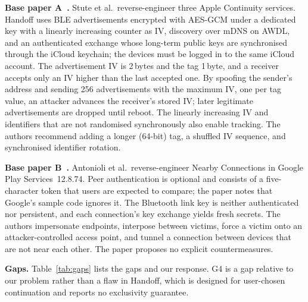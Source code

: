 \documentclass[conference]{IEEEtran}
\begin{document}
\textbf{Base paper A~\cite{stute2021}.} Stute et al.\ reverse-engineer three Apple Continuity services. Handoff uses BLE advertisements encrypted with AES-GCM under a dedicated key with a linearly increasing counter as IV, discovery over mDNS on AWDL, and an authenticated exchange whose long-term public keys are synchronised through the iCloud keychain; the devices must be logged in to the same iCloud account. The advertisement IV is 2\,bytes and the tag 1\,byte, and a receiver accepts only an IV higher than the last accepted one. By spoofing the sender's address and sending 256 advertisements with the maximum IV, one per tag value, an attacker advances the receiver's stored IV; later legitimate advertisements are dropped until reboot. The linearly increasing IV and identifiers that are not randomised synchronously also enable tracking. The authors recommend adding a longer (64-bit) tag, a shuffled IV sequence, and synchronised identifier rotation.

\textbf{Base paper B~\cite{antonioli2019}.} Antonioli et al.\ reverse-engineer Nearby Connections in Google Play Services~12.8.74. Peer authentication is optional and consists of a five-character token that users are expected to compare; the paper notes that Google's sample code ignores it. The Bluetooth link key is neither authenticated nor persistent, and each connection's key exchange yields fresh secrets. The authors impersonate endpoints, interpose between victims, force a victim onto an attacker-controlled access point, and tunnel a connection between devices that are not near each other. The paper proposes no explicit countermeasures.

\textbf{Gaps.} Table~\ref{tab:gaps} lists the gaps and our response. G4 is a gap relative to our problem rather than a flaw in Handoff, which is designed for user-chosen continuation and reports no exclusivity guarantee.
\end{document}
